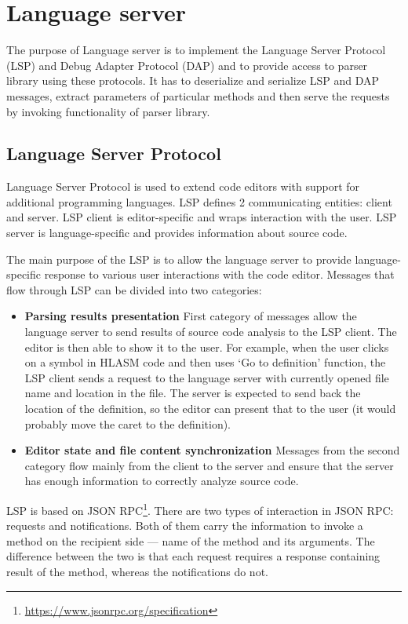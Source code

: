 \chapter{Language server}

The purpose of Language server is to implement the Language Server Protocol (LSP) and Debug Adapter Protocol (DAP) and to provide access to parser library using these protocols. It has to deserialize and serialize LSP and DAP messages, extract parameters of particular methods and then serve the requests by invoking functionality of parser library.

\section{Language Server Protocol}
Language Server Protocol is used to extend code editors with support for additional programming languages. LSP defines 2 communicating entities: client and server. LSP client is editor-specific and wraps interaction with the user. LSP server is language-specific and provides information about source code.

The main purpose of the LSP is to allow the language server to provide language-specific response to various user interactions with the code editor. Messages that flow through LSP can be divided into two categories:

\begin{itemize}%
	\item \textbf{Parsing results presentation} First category of messages allow the language server to send results of source code analysis to the LSP client. The editor is then able to show it to the user. For example, when the user clicks on a symbol in HLASM code and then uses `Go to definition' function, the LSP client sends a request to the language server with currently opened file name and location in the file. The server is expected to send back the location of the definition, so the editor can present that to the user (it would probably move the caret to the definition).

	\item \textbf{Editor state and file content synchronization} Messages from the second category flow mainly from the client to the server and ensure that the server has enough information to correctly analyze source code.

\end{itemize}

LSP is based on JSON RPC\footnote{\url{https://www.jsonrpc.org/specification}}. There are two types of interaction in JSON RPC: requests and notifications. Both of them carry the information to invoke a method on the recipient side ---  name of the method and its arguments. The difference between the two is that each request requires a response containing result of the method, whereas the notifications do not.

